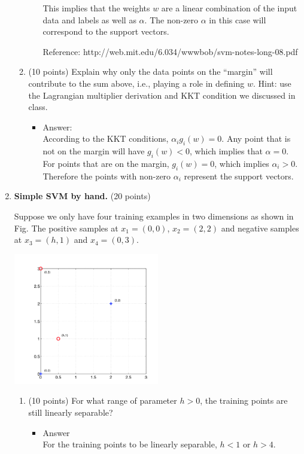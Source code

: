 \documentclass[twoside,10pt]{article}
\begin{document}
\begin{enumerate}
\begin{enumerate}
\begin{itemize}
This implies that the weights $w$ are a linear combination of the input data and labels as well as $\alpha$. The non-zero $\alpha$ in this case will correspond to the support vectors.

Reference:
http://web.mit.edu/6.034/wwwbob/svm-notes-long-08.pdf

\end{itemize}
\item (10 points) Explain why only the data points on the ``margin'' will contribute to the sum above, i.e., playing a role in defining $w$. Hint: use the Lagrangian multiplier derivation and KKT condition we discussed in class. 
\begin{itemize}
\item Answer:\\
According to the KKT conditions, $\alpha_i g_i (w) = 0$. Any point that is not on the margin will have $g_i(w) < 0$, which implies that $\alpha = 0$. For points that are on the margin, $g_i(w) = 0$, which implies $\alpha_i > 0$. Therefore the points with non-zero $\alpha_i$ represent the support vectors.
\end{itemize}

\end{enumerate}



\item{\bf  Simple SVM by hand.} (20 points)

Suppose we only have four training examples in two dimensions as shown in Fig. The positive samples at $x_1 = (0, 0)$, $x_2 = (2, 2)$ and negative samples at $x_3 = (h, 1)$ and $x_4 = (0, 3)$. 
%
\begin{center}
\includegraphics[width = 0.5\textwidth]{svm}
\end{center}

\begin{enumerate}
\item (10 points) For what range of parameter $h > 0$, the training points are still linearly separable?
\begin{itemize}
\item Answer\\
For the training points to be linearly separable, $h<1$ or $h>4$.
\end{itemize}



\end{enumerate}
\end{enumerate}
\end{document}
